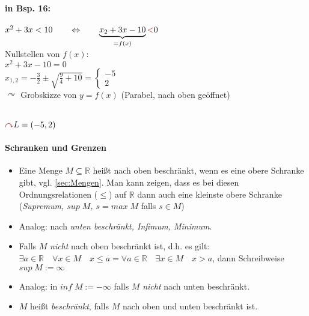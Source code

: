 \paragraph{in Bsp. 16:} \parskp
$x^2+3x<10 \qquad \Leftrightarrow \qquad \underbrace{x_2+3x-10}_{=f(x)}\tred{<}0$\\
Nullstellen von $f(x)$: \\
$x^2+3x-10=0$\\
$x_{1,2}=-\frac{3}{2}\pm \sqrt{\frac{9}{4}+10}=\begin{cases}
-5\\
2
\end{cases}$\\
$\curvearrowright$ Grobskizze von $y=f(x)$ (Parabel, nach oben geöffnet)\\
\\
$\tred{\curvearrowright} L=(-5,2)$

\paragraph{Schranken und Grenzen}
\begin{itemize}
\item Eine Menge $M\subseteq \mathbb{R}$ heißt nach oben beschränkt, wenn es eine obere Schranke gibt, vgl. \ref{sec:Mengen}. Man kann zeigen, dass es bei diesen Ordnungsrelationen ($\leq$) auf $\mathbb{R}$ dann auch eine kleinste obere Schranke (\emph{Supremum, $sup\;M$, $s=max \; M$} falls $s \in M$)
\item Analog: nach \emph{unten beschränkt, Infimum, Minimum}.
\item Falls $M$ \emph{nicht} nach oben beschränkt ist, d.h. es gilt:\\
$\exists a \in \mathbb{R}\quad \forall x \in M\quad x \leq a = \forall a \in \mathbb{R} \quad \exists x \in M \quad x >a$, dann Schreibweise $\boxed{sup\; M := \infty}$
\item Analog: in $\boxed{inf\; M:= - \infty}$ falls $M$ \emph{nicht} nach unten beschränkt.
\item $M$ heißt \emph{beschränkt}, falls $M$ nach oben und unten beschränkt ist.
\end{itemize} 

